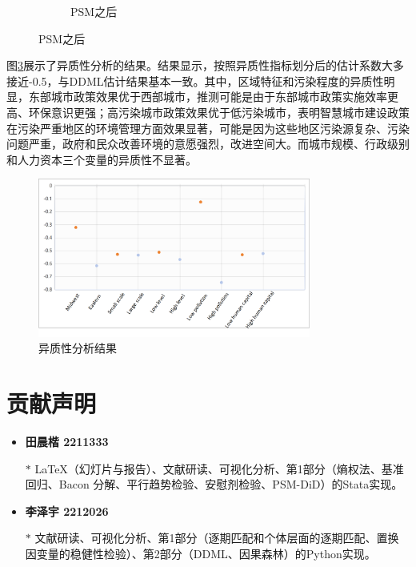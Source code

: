 \documentclass[a4paper,12pt]{article}
\begin{document}
\begin{figure}[H]
\begin{subfigure}[b]{0.45\textwidth}
        \caption{PSM之后}
        \label{fig:Qini2}
    \end{subfigure}
    \label{fig:Qini}
\end{figure}

图\ref{fig:hetero}展示了异质性分析的结果。结果显示，按照异质性指标划分后的估计系数大多接近-0.5，与DDML估计结果基本一致。其中，区域特征和污染程度的异质性明显，东部城市政策效果优于西部城市，推测可能是由于东部城市政策实施效率更高、环保意识更强；高污染城市政策效果优于低污染城市，表明智慧城市建设政策在污染严重地区的环境管理方面效果显著，可能是因为这些地区污染源复杂、污染问题严重，政府和民众改善环境的意愿强烈，改进空间大。而城市规模、行政级别和人力资本三个变量的异质性不显著。

\begin{figure}[H]
    \centering
    \includegraphics[width=0.8\textwidth]{Hetero.jpg}  
    \caption{异质性分析结果}
    \label{fig:hetero}  
\end{figure}


\section{贡献声明}

\begin{itemize}
    \item \textbf{田晨楷 2211333}
    \item[$\ast$] \LaTeX（幻灯片与报告）、文献研读、可视化分析、第1部分（熵权法、基准回归、Bacon 分解、平行趋势检验、安慰剂检验、PSM-DiD）的Stata实现。
\end{itemize}

\begin{itemize}
    \item \textbf{李泽宇 2212026}
    \item[$\ast$] 文献研读、可视化分析、第1部分（逐期匹配和个体层面的逐期匹配、置换因变量的稳健性检验）、第2部分（DDML、因果森林）的Python实现。
\end{itemize}
\end{document}
